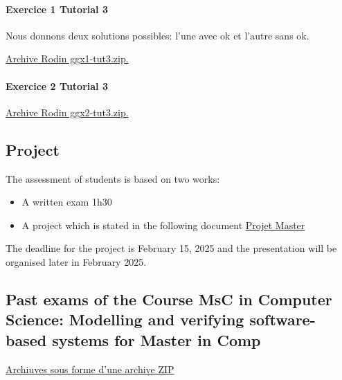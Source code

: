 \documentclass[ 12pt]{article}
\begin{document}
\paragraph{Exercice 1 Tutorial 3}

Nous donnons deux solutions possibles: l'une avec ok et l'autre sans ok.

\href{http://mery54.github.io/teaching/mosos/models/qqx1-tut3.zip}{Archive 
  Rodin   ggx1-tut3.zip.}




\paragraph{Exercice 2 Tutorial 3}

\href{http://mery54.github.io/teaching/mosos/models/ggx2-tut3.zip}{Archive 
  Rodin   ggx2-tut3.zip.}






  \subsection{Project}
\label{sec:project}

The assessment  of students is based on two works:
\begin{itemize}
\item A written  exam   1h30
\item A project which is stated in the following document
  \href{http://mery54.github.io/teaching/mosos/lecturesnotes/master-projets2425.pdf}{Projet
    Master } 
\end{itemize}

The deadline for the project is  February 15, 2025 and the presentation
will be  organised later in February 2025. 



\subsection{Past exams  of  the  Course MsC in Computer Science: Modelling and verifying software-based systems for Master in Comp}
\label{sec:past-exams-course}


\href{http://mery54.github.io/teaching/mosos/lecturesnotes/annales-master2425.zip}{Archiuves
sous forme d'une archive ZIP}






\end{document}
